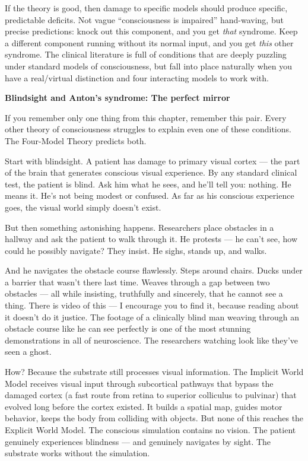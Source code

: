 \documentclass[11pt, twoside, openright]{book}
\begin{document}
If the theory is good, then damage to specific models should produce specific, predictable deficits. Not vague ``consciousness is impaired'' hand-waving, but precise predictions: knock out this component, and you get \textit{that} syndrome. Keep a different component running without its normal input, and you get \textit{this} other syndrome. The clinical literature is full of conditions that are deeply puzzling under standard models of consciousness, but fall into place naturally when you have a real/virtual distinction and four interacting models to work with.

\textbf{Blindsight and Anton's syndrome: The perfect mirror}

If you remember only one thing from this chapter, remember this pair. Every other theory of consciousness struggles to explain even one of these conditions. The Four-Model Theory predicts both.

Start with blindsight. A patient has damage to primary visual cortex --- the part of the brain that generates conscious visual experience. By any standard clinical test, the patient is blind. Ask him what he sees, and he'll tell you: nothing. He means it. He's not being modest or confused. As far as his conscious experience goes, the visual world simply doesn't exist.

But then something astonishing happens. Researchers place obstacles in a hallway and ask the patient to walk through it. He protests --- he can't see, how could he possibly navigate? They insist. He sighs, stands up, and walks.

And he navigates the obstacle course flawlessly. Steps around chairs. Ducks under a barrier that wasn't there last time. Weaves through a gap between two obstacles --- all while insisting, truthfully and sincerely, that he cannot see a thing. There is video of this --- I encourage you to find it, because reading about it doesn't do it justice. The footage of a clinically blind man weaving through an obstacle course like he can see perfectly is one of the most stunning demonstrations in all of neuroscience. The researchers watching look like they've seen a ghost.

How? Because the substrate still processes visual information. The Implicit World Model receives visual input through subcortical pathways that bypass the damaged cortex (a fast route from retina to superior colliculus to pulvinar) that evolved long before the cortex existed. It builds a spatial map, guides motor behavior, keeps the body from colliding with objects. But none of this reaches the Explicit World Model. The conscious simulation contains no vision. The patient genuinely experiences blindness --- and genuinely navigates by sight. The substrate works without the simulation.
\end{document}
